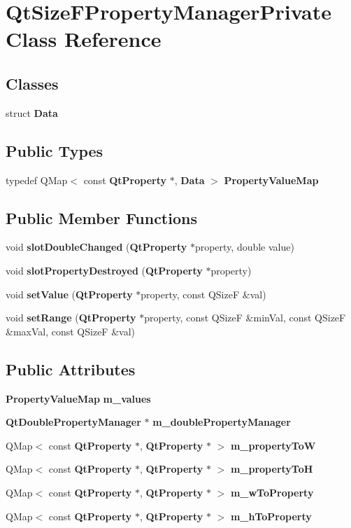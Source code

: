 \section{Qt\+Size\+F\+Property\+Manager\+Private Class Reference}
\label{classQtSizeFPropertyManagerPrivate}
\subsection*{Classes}
\begin{DoxyCompactItemize}
\item 
struct {\bf Data}
\end{DoxyCompactItemize}
\subsection*{Public Types}
\begin{DoxyCompactItemize}
\item 
typedef Q\+Map$<$ const {\bf Qt\+Property} $\ast$, {\bf Data} $>$ {\bf Property\+Value\+Map}
\end{DoxyCompactItemize}
\subsection*{Public Member Functions}
\begin{DoxyCompactItemize}
\item 
void {\bf slot\+Double\+Changed} ({\bf Qt\+Property} $\ast$property, double value)
\item 
void {\bf slot\+Property\+Destroyed} ({\bf Qt\+Property} $\ast$property)
\item 
void {\bf set\+Value} ({\bf Qt\+Property} $\ast$property, const Q\+SizeF \&val)
\item 
void {\bf set\+Range} ({\bf Qt\+Property} $\ast$property, const Q\+SizeF \&min\+Val, const Q\+SizeF \&max\+Val, const Q\+SizeF \&val)
\end{DoxyCompactItemize}
\subsection*{Public Attributes}
\begin{DoxyCompactItemize}
\item 
{\bf Property\+Value\+Map} {\bf m\+\_\+values}
\item 
{\bf Qt\+Double\+Property\+Manager} $\ast$ {\bf m\+\_\+double\+Property\+Manager}
\item 
Q\+Map$<$ const {\bf Qt\+Property} $\ast$, {\bf Qt\+Property} $\ast$ $>$ {\bf m\+\_\+property\+ToW}
\item 
Q\+Map$<$ const {\bf Qt\+Property} $\ast$, {\bf Qt\+Property} $\ast$ $>$ {\bf m\+\_\+property\+ToH}
\item 
Q\+Map$<$ const {\bf Qt\+Property} $\ast$, {\bf Qt\+Property} $\ast$ $>$ {\bf m\+\_\+w\+To\+Property}
\item 
Q\+Map$<$ const {\bf Qt\+Property} $\ast$, {\bf Qt\+Property} $\ast$ $>$ {\bf m\+\_\+h\+To\+Property}
\end{DoxyCompactItemize}


